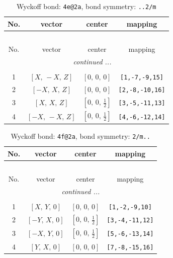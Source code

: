 \documentclass[fleqn,8pt]{jsarticle}
\begin{document}
\renewcommand{\arraystretch}{1.2}
\begin{longtable}{cccc}
\caption{Wyckoff bond: {\tt 4e@2a}, bond symmetry: {\tt ..2/m}}
 \\
 \hline \hline
No. & vector & center & mapping \\ \hline \endfirsthead

\multicolumn{3}{l}{\tablename\ \thetable{}} \\
 \hline \hline
No. & vector & center & mapping \\ \hline \endhead

 \hline \hline
\multicolumn{3}{r}{\footnotesize\it continued ...} \\ \endfoot

 \hline \hline
\multicolumn{3}{r}{} \\ \endlastfoot

1 & $\left[ X,\, - X,\, Z \right]$ & $\left[ 0,\, 0,\, 0 \right]$ & {\tt [1,-7,-9,15]} \\ \hline
2 & $\left[ - X,\, X,\, Z \right]$ & $\left[ 0,\, 0,\, 0 \right]$ & {\tt [2,-8,-10,16]} \\ \hline
3 & $\left[ X,\, X,\, Z \right]$ & $\left[ 0,\, 0,\, \frac{1}{2} \right]$ & {\tt [3,-5,-11,13]} \\ \hline
4 & $\left[ - X,\, - X,\, Z \right]$ & $\left[ 0,\, 0,\, \frac{1}{2} \right]$ & {\tt [4,-6,-12,14]} \\
\end{longtable}
\renewcommand{\arraystretch}{1.2}
\begin{longtable}{cccc}
\caption{Wyckoff bond: {\tt 4f@2a}, bond symmetry: {\tt 2/m..}}
 \\
 \hline \hline
No. & vector & center & mapping \\ \hline \endfirsthead

\multicolumn{3}{l}{\tablename\ \thetable{}} \\
 \hline \hline
No. & vector & center & mapping \\ \hline \endhead

 \hline \hline
\multicolumn{3}{r}{\footnotesize\it continued ...} \\ \endfoot

 \hline \hline
\multicolumn{3}{r}{} \\ \endlastfoot

1 & $\left[ X,\, Y,\, 0 \right]$ & $\left[ 0,\, 0,\, 0 \right]$ & {\tt [1,-2,-9,10]} \\ \hline
2 & $\left[ - Y,\, X,\, 0 \right]$ & $\left[ 0,\, 0,\, \frac{1}{2} \right]$ & {\tt [3,-4,-11,12]} \\ \hline
3 & $\left[ - X,\, Y,\, 0 \right]$ & $\left[ 0,\, 0,\, \frac{1}{2} \right]$ & {\tt [5,-6,-13,14]} \\ \hline
4 & $\left[ Y,\, X,\, 0 \right]$ & $\left[ 0,\, 0,\, 0 \right]$ & {\tt [7,-8,-15,16]} \\
\end{longtable}
\end{document}
